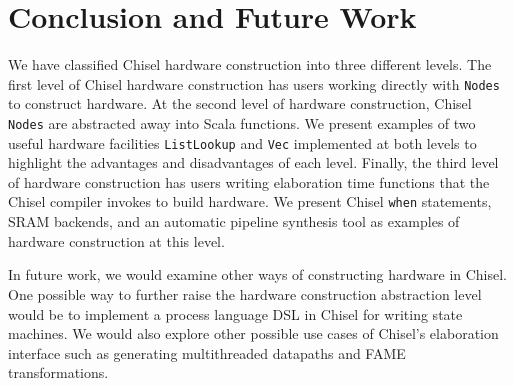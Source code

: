 \section{Conclusion and Future Work}
We have classified Chisel hardware construction into three different
levels. The first level of Chisel hardware construction has users
working directly with {\tt Nodes} to construct hardware. At the second level
of hardware construction, Chisel {\tt Nodes} are abstracted away into
Scala functions. We present examples of two useful hardware facilities
{\tt ListLookup} and {\tt Vec} implemented at both levels to highlight
the advantages and disadvantages of each level. Finally, the third
level of hardware construction has users writing elaboration time
functions that the Chisel compiler invokes to build hardware. We
present Chisel {\tt when} statements, SRAM backends, and an automatic
pipeline synthesis tool as examples of hardware construction at this
level.

In future work, we would examine other ways of constructing hardware
in Chisel. One possible way to further raise the hardware construction
abstraction level would be to implement a process language DSL in Chisel
for writing state machines. We would also explore other possible
use cases of Chisel's elaboration interface such as generating
multithreaded datapaths and FAME~\cite{fame} transformations.
